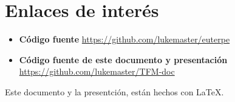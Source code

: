 \chapter{Enlaces de interés}


\begin{itemize}
    \item \textbf{Código fuente} \url{https://github.com/lukemaster/euterpe}
    \item \textbf{Código fuente de este documento y presentación} \url{https://github.com/lukemaster/TFM-doc}
\end{itemize}

Este documento y la presentción, están hechos con \LaTeX.